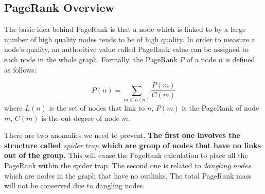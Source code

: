 \documentclass[12pt,conference,letterpaper]{IEEEtran}
\begin{document}
\subsection{PageRank Overview}
The basic idea behind PageRank is that a node which is linked to by a large number of high quality nodes tends to be of high quality. In order to measure a node's quality, an authoritive value called PageRank value can be assigned to each node in the whole graph. Formally, the PageRank $P$ of a node $n$ is defined as follows:



\begin{equation}
P(n) = \sum_{m \in L(n)} \frac{P(m)}{C(m)} \label{eq:pr_1}
\end{equation}
where $L(n)$ is the set of nodes that link to $n$, $P(m)$ is the PageRank of node $m$, $C(m)$ is the out-degree of node $m$.


There are two anomalies we need to prevent. {\bf The first one involves the structure called $spider\;trap$ which are group of nodes that have no links out of the group.} This will cause the PageRank calculation to place all the PageRank within the spider trap. The second one is related to $dangling\;nodes$ which are nodes in the graph that have no outlinks. The total PageRank mass will not be conserved due to dangling nodes. 
\end{document}

